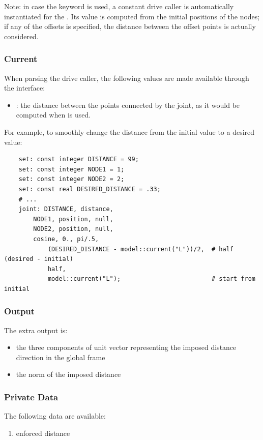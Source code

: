 Note: in case the keyword  is used, a constant drive
caller is automatically instantiated for the . 
Its value is computed from the initial positions of the nodes;
if any of the offsets is specified, the distance between the offset points is actually considered. 



\subsubsection{Current}
When parsing the drive caller, the following values are made available
through the  interface:
\begin{itemize}
\item
{}: 
the distance between the points connected by the joint,
as it would be computed when  is used.
\end{itemize}
For example, to smoothly change the distance from the initial value to a desired value:
\begin{verbatim}
    set: const integer DISTANCE = 99;
    set: const integer NODE1 = 1;
    set: const integer NODE2 = 2;
    set: const real DESIRED_DISTANCE = .33;
    # ...
    joint: DISTANCE, distance,
        NODE1, position, null,
        NODE2, position, null,
        cosine, 0., pi/.5,
            (DESIRED_DISTANCE - model::current("L"))/2,  # half (desired - initial)
            half,
            model::current("L");                         # start from initial
\end{verbatim}



\subsubsection{Output}
The extra output is:
\begin{itemize}
    \item the three components of unit vector representing the imposed 
      distance direction in the global frame
    \item the norm of the imposed distance
\end{itemize}

\subsubsection{Private Data}
The following data are available:
\begin{enumerate}
\item {} enforced distance
\end{enumerate}

